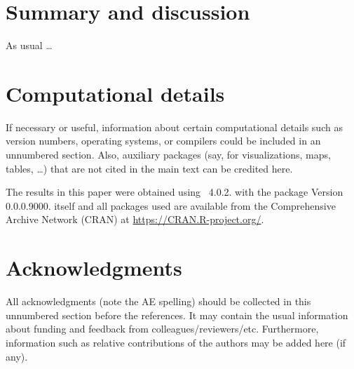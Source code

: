 \documentclass[article]{jss}
\begin{document}

\section{Summary and discussion} \label{sec:summary}

\begin{leftbar}
As usual \dots
\end{leftbar}



\section*{Computational details}

\begin{leftbar}
If necessary or useful, information about certain computational details
such as version numbers, operating systems, or compilers could be included
in an unnumbered section. Also, auxiliary packages (say, for visualizations,
maps, tables, \dots) that are not cited in the main text can be credited here.
\end{leftbar}

The results in this paper were obtained using
~4.0.2. 
with the  package Version 0.0.0.9000. 
 itself
and all packages used are available from the Comprehensive
 Archive Network (CRAN) at
\url{https://CRAN.R-project.org/}.


\section*{Acknowledgments}

\begin{leftbar}
All acknowledgments (note the AE spelling) should be collected in this
unnumbered section before the references. It may contain the usual information
about funding and feedback from colleagues/reviewers/etc. Furthermore,
information such as relative contributions of the authors may be added here
(if any).
\end{leftbar}


\end{document}
